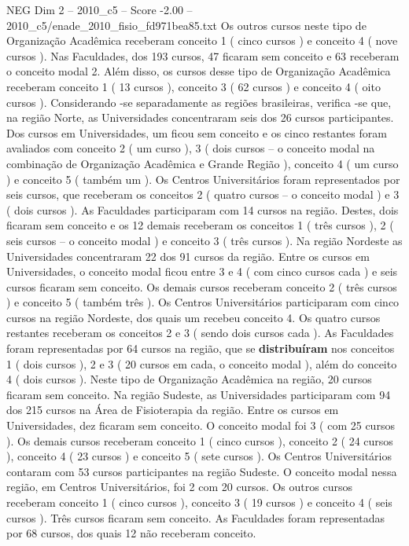 \begin{textsample}{NEG Dim 2 – 2010\_c5 – Score -2.00 – 2010\_c5/enade\_2010\_fisio\_fd971bea85.txt}
Os outros cursos neste tipo de Organização Acadêmica receberam conceito 1 ( cinco cursos ) e conceito 4 ( nove cursos ).
Nas Faculdades, dos 193 cursos, 47 ficaram sem conceito e 63 receberam o conceito modal 2.
Além disso, os cursos desse tipo de Organização Acadêmica receberam conceito 1 ( 13 cursos ), conceito 3 ( 62 cursos ) e conceito 4 ( oito cursos ).
Considerando -se separadamente as regiões brasileiras, verifica -se que, na região Norte, as Universidades concentraram seis dos 26 cursos participantes.
Dos cursos em Universidades, um ficou sem conceito e os cinco restantes foram avaliados com conceito 2 ( um curso ), 3 ( dois cursos – o conceito modal na combinação de Organização Acadêmica e Grande Região ), conceito 4 ( um curso ) e conceito 5 ( também um ).
Os Centros Universitários foram representados por seis cursos, que receberam os conceitos 2 ( quatro cursos – o conceito modal ) e 3 ( dois cursos ).
As Faculdades participaram com 14 cursos na região.
Destes, dois ficaram sem conceito e os 12 demais receberam os conceitos 1 ( três cursos ), 2 ( seis cursos – o conceito modal ) e conceito 3 ( três cursos ).
Na região Nordeste as Universidades concentraram 22 dos 91 cursos da região.
Entre os cursos em Universidades, o conceito modal ficou entre 3 e 4 ( com cinco cursos cada ) e seis cursos ficaram sem conceito.
Os demais cursos receberam conceito 2 ( três cursos ) e conceito 5 ( também três ).
Os Centros Universitários participaram com cinco cursos na região Nordeste, dos quais um recebeu conceito 4.
Os quatro cursos restantes receberam os conceitos 2 e 3 ( sendo dois cursos cada ).
As Faculdades foram representadas por 64 cursos na região, que se \textbf{distribuíram} nos conceitos 1 ( dois cursos ), 2 e 3 ( 20 cursos em cada, o conceito modal ), além do conceito 4 ( dois cursos ).
Neste tipo de Organização Acadêmica na região, 20 cursos ficaram sem conceito.
Na região Sudeste, as Universidades participaram com 94 dos 215 cursos na Área de Fisioterapia da região.
Entre os cursos em Universidades, dez ficaram sem conceito.
O conceito modal foi 3 ( com 25 cursos ).
Os demais cursos receberam conceito 1 ( cinco cursos ), conceito 2 ( 24 cursos ), conceito 4 ( 23 cursos ) e conceito 5 ( sete cursos ).
Os Centros Universitários contaram com 53 cursos participantes na região Sudeste.
O conceito modal nessa região, em Centros Universitários, foi 2 com 20 cursos.
Os outros cursos receberam conceito 1 ( cinco cursos ), conceito 3 ( 19 cursos ) e conceito 4 ( seis cursos ).
Três cursos ficaram sem conceito.
As Faculdades foram representadas por 68 cursos, dos quais 12 não receberam conceito.

\end{textsample}
